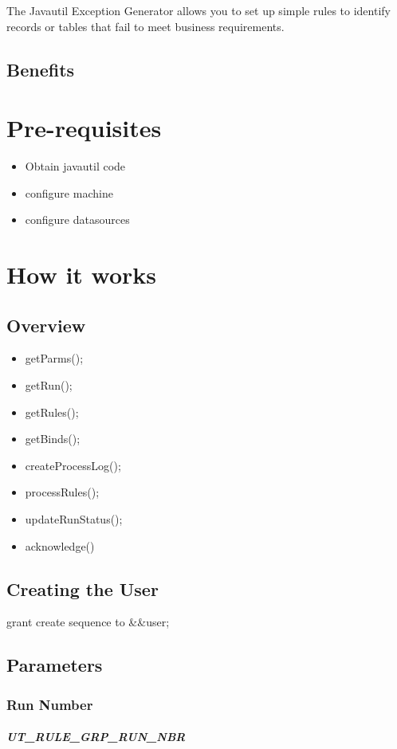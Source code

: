 \documentclass[a4paper,10pt]{book}
\begin{document}
The Javautil Exception Generator allows you to set up simple rules to identify records or tables that fail
to meet business requirements.

\section{Benefits}

\chapter{Pre-requisites}
\begin{itemize}
 \item Obtain javautil code
 \item configure machine
 \item configure datasources
\end{itemize}
\chapter{How it works}
\section{Overview}
\begin{itemize}
 \item getParms();
 \item getRun();
 \item getRules();
 \item getBinds();
 \item createProcessLog();
 \item processRules();
 \item updateRunStatus();
 \item acknowledge()
\end{itemize}
\section{Creating the User}
grant create sequence to &&user;
\section{Parameters}
\subsection{Run Number}
\paragraph{UT_RULE_GRP_RUN_NBR}
\end{document}
